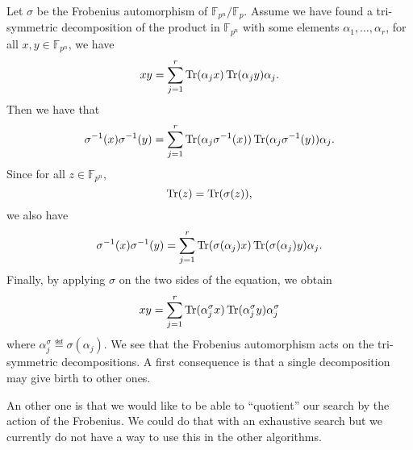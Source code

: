 \documentclass[a4paper,11pt]{article}
\begin{document}
Let $\sigma$ be the Frobenius automorphism of $\mathbb{F}_{p^n}/\mathbb{F}_p$.
Assume we have found a tri-symmetric decomposition of the product in
$\mathbb{F}_{p^n}$ with some elements $\alpha_1, \dots, \alpha_r$, \ie for all
$x, y\in\mathbb{F}_{p^n}$, we have
\[
  xy = \sum_{j=1}^r \operatorname{Tr}(\alpha_jx)\operatorname{Tr}(\alpha_jy)\alpha_j.
\]
Then we have that
\[
  \sigma^{-1}(x)\sigma^{-1}(y) = \sum_{j=1}^r
  \operatorname{Tr}(\alpha_j\sigma^{-1}(x))\operatorname{Tr}(\alpha_j\sigma^{-1}(y))\alpha_j.
\]
Since for all $z\in\mathbb{F}_{p^n}$,
\[
  \operatorname{Tr}(z) = \operatorname{Tr}(\sigma(z)),
\]
we also have
\[
  \sigma^{-1}(x)\sigma^{-1}(y) = \sum_{j=1}^r
  \operatorname{Tr}(\sigma(\alpha_j)x)\operatorname{Tr}(\sigma(\alpha_j)y)\alpha_j.
\]
Finally, by applying $\sigma$ on the two sides of the equation, we obtain
\[
  xy = \sum_{j=1}^r \operatorname{Tr}(\alpha_j^\sigma x)\operatorname{Tr}(\alpha_j^\sigma y)\alpha_j^\sigma
\]
where $\alpha_j^\sigma \eqdef \sigma(\alpha_j)$. We see that the Frobenius
automorphism acts on the tri-symmetric decompositions. A first consequence is
that a single decomposition may give birth to other ones.

An other one is that we would like to be able to ``quotient'' our search by the
action of the Frobenius. We could do that with an exhaustive search but we
currently do not have a way to use this in the other algorithms. 



\end{document}
